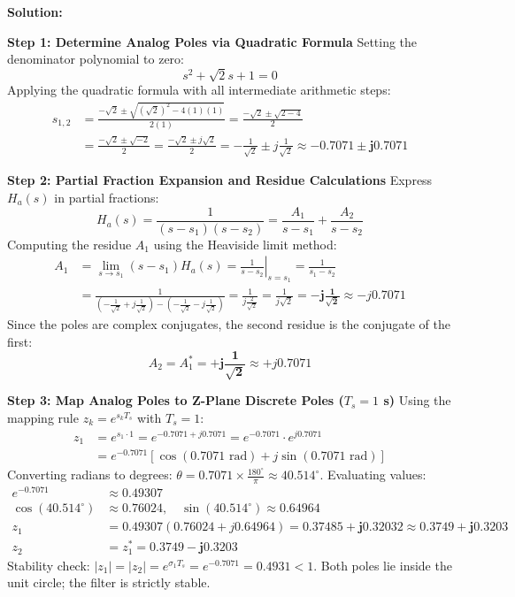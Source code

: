 \documentclass[11pt,a4paper]{article}
\begin{document}
\vspace{1mm}
\noindent\textbf{Solution:}

\noindent\textbf{Step 1: Determine Analog Poles via Quadratic Formula}
Setting the denominator polynomial to zero:
\begin{equation}
s^2 + \sqrt{2} s + 1 = 0
\end{equation}
Applying the quadratic formula with all intermediate arithmetic steps:
\begin{align}
s_{1,2} &= \frac{-\sqrt{2} \pm \sqrt{(\sqrt{2})^2 - 4(1)(1)}}{2(1)} = \frac{-\sqrt{2} \pm \sqrt{2 - 4}}{2} \nonumber \\
&= \frac{-\sqrt{2} \pm \sqrt{-2}}{2} = \frac{-\sqrt{2} \pm j\sqrt{2}}{2} = -\frac{1}{\sqrt{2}} \pm j \frac{1}{\sqrt{2}} \approx \mathbf{-0.7071 \pm j 0.7071}
\end{align}

\noindent\textbf{Step 2: Partial Fraction Expansion and Residue Calculations}
Express $H_a(s)$ in partial fractions:
\begin{equation}
H_a(s) = \frac{1}{(s - s_1)(s - s_2)} = \frac{A_1}{s - s_1} + \frac{A_2}{s - s_2}
\end{equation}
Computing the residue $A_1$ using the Heaviside limit method:
\begin{align}
A_1 &= \lim_{s \to s_1} (s - s_1) H_a(s) = \left. \frac{1}{s - s_2} \right|_{s = s_1} = \frac{1}{s_1 - s_2} \nonumber \\
&= \frac{1}{\left(-\frac{1}{\sqrt{2}} + j\frac{1}{\sqrt{2}}\right) - \left(-\frac{1}{\sqrt{2}} - j\frac{1}{\sqrt{2}}\right)} = \frac{1}{j \frac{2}{\sqrt{2}}} = \frac{1}{j \sqrt{2}} = \mathbf{-j \frac{1}{\sqrt{2}}} \approx -j 0.7071
\end{align}
Since the poles are complex conjugates, the second residue is the conjugate of the first:
\begin{equation}
A_2 = A_1^* = \mathbf{+j \frac{1}{\sqrt{2}}} \approx +j 0.7071
\end{equation}

\noindent\textbf{Step 3: Map Analog Poles to Z-Plane Discrete Poles ($T_s = 1$ s)}
Using the mapping rule $z_k = e^{s_k T_s}$ with $T_s = 1$:
\begin{align}
z_1 &= e^{s_1 \cdot 1} = e^{-0.7071 + j 0.7071} = e^{-0.7071} \cdot e^{j 0.7071} \nonumber \\
&= e^{-0.7071} \left[ \cos(0.7071 \text{ rad}) + j \sin(0.7071 \text{ rad}) \right]
\end{align}
Converting radians to degrees: $\theta = 0.7071 \times \frac{180^\circ}{\pi} \approx 40.514^\circ$. Evaluating values:
\begin{align}
e^{-0.7071} &\approx 0.49307 \nonumber \\
\cos(40.514^\circ) &\approx 0.76024, \quad \sin(40.514^\circ) \approx 0.64964 \nonumber \\
z_1 &= 0.49307(0.76024 + j 0.64964) = \mathbf{0.37485 + j 0.32032} \approx \mathbf{0.3749 + j 0.3203} \nonumber \\
z_2 &= z_1^* = \mathbf{0.3749 - j 0.3203}
\end{align}
Stability check: $|z_1| = |z_2| = e^{\sigma_1 T_s} = e^{-0.7071} = 0.4931 < 1$. Both poles lie inside the unit circle; the filter is strictly stable.
\end{document}
